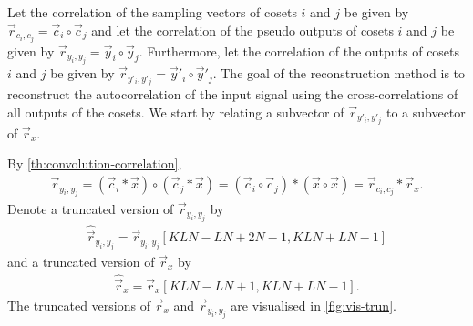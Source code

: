 \documentclass[a4paper, openany, oneside]{memoir}
\begin{document}
Let the correlation of the sampling vectors of cosets $i$ and $j$ be given by $\vec{r}_{c_i,c_j} = \vec{c}_i \circ \vec{c}_j$ and let the correlation of the pseudo outputs of cosets $i$ and $j$ be given by $\vec{r}_{y_i,y_j} = \vec{y}_i \circ \vec{y}_j$. Furthermore, let the correlation of the outputs of cosets $i$ and $j$ be given by $\vec{r}_{y'_i,y'_j} = \vec{y}'_i \circ \vec{y}'_j$. The goal of the reconstruction method is to reconstruct the autocorrelation of the input signal using the cross-correlations of all outputs of the cosets. We start by relating a subvector of $\vec{r}_{y'_i,y'_j}$ to a subvector of $\vec{r}_x$.

\begin{blockTheorem} \label{th:convolution-correlation}
     \nolinebreak
\end{blockTheorem}

By \cref{th:convolution-correlation},
\begin{align*}
    \vec{r}_{y_i,y_j} =(\vec{c}_i \ast \vec{x}) \circ (\vec{c}_j \ast \vec{x}) = (\vec{c}_i \circ \vec{c}_j) \ast (\vec{x} \circ \vec{x}) = \vec{r}_{c_i,c_j} \ast \vec{r}_x.
\end{align*}
Denote a truncated version of $\vec{r}_{y_i,y_j}$ by
\begin{align*}
    \hat{\vec{r}}_{y_i,y_j} = \vec{r}_{y_i,y_j}[KLN-LN+2N-1,KLN+LN-1]
\end{align*}
and a truncated version of $\vec{r}_x$ by
\begin{align*}
    \hat{\vec{r}}_x = \vec{r}_x [KLN-LN+1,KLN+LN-1].
\end{align*}
The truncated versions of $\vec{r}_x$ and $\vec{r}_{y_i,y_j}$ are visualised in \cref{fig:vis-trun}.
\end{document}
